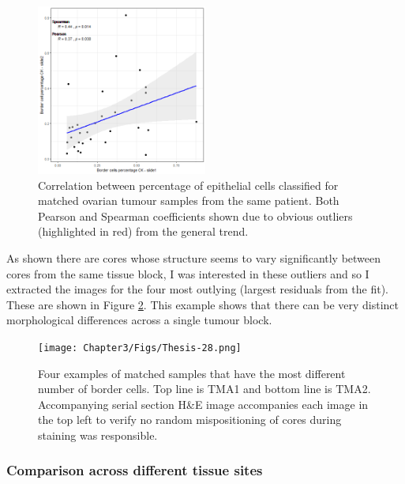 \begin{figure}
    \centering
    \includegraphics[width=0.5\textwidth]{Chapter3/edge_plot_676514_676513.png}
    \caption[Correlation between percentage of epithelial cells classified for matched Ovarian samples]{Correlation between percentage of epithelial cells classified for matched ovarian tumour samples from the same patient. Both Pearson and Spearman coefficients shown due to obvious outliers (highlighted in red) from the general trend.}
    \label{fig:border_cells}
\end{figure}

As shown there are cores whose structure seems to vary significantly between cores from the same tissue block, I was interested in these outliers and so I extracted the images for the four most outlying (largest residuals from the fit). These are shown in Figure \ref{fig:outlying_edges}. This example shows that there can be very distinct morphological differences across a single tumour block. 
\begin{figure}
    \centering
    \texttt{[image: Chapter3/Figs/Thesis-28.png]}
    \caption{Four examples of matched samples that have the most different number of border cells. Top line is TMA1 and bottom line is TMA2. Accompanying serial section H\&E image accompanies each image in the top left to verify no random mispositioning of cores during staining was responsible.}
    \label{fig:outlying_edges}
\end{figure}

\subsubsection{Comparison across different tissue sites}

